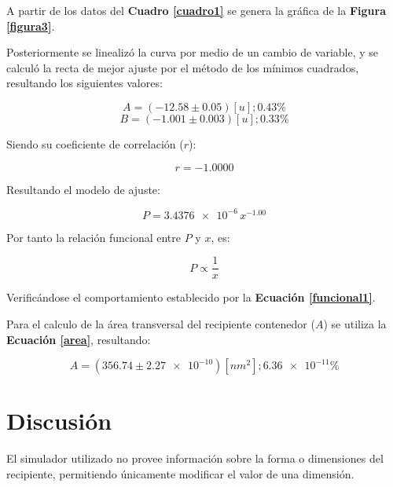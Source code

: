 \documentclass[letter,11pt]{article}
\begin{document}
A partir de los datos del \textbf{Cuadro \ref{cuadro1}} se genera la gráfica de
la \textbf{Figura \ref{figura3}}.

Posteriormente se linealizó la curva por medio de un cambio de variable, y se
calculó la recta de mejor ajuste por el método de los mínimos cuadrados,
resultando los siguientes valores:

\begin{equation*}
    A = (-12.58 \pm 0.05) [u]; 0.43\%
\end{equation*}
\begin{equation*}
    B = (-1.001 \pm 0.003) [u]; 0.33\%
\end{equation*}
\vspace{0.10cm}

Siendo su coeficiente de correlación ($r$):

\begin{equation*}
    r = -1.0000
\end{equation*}
\vspace{0.10cm}

Resultando el modelo de ajuste:

\begin{equation*}
    P = \num{3.4376e-6}\,x^{-1.00}
\end{equation*}
\vspace{0.10cm}

Por tanto la relación funcional entre $P$ y $x$, es:

\begin{equation*}
    P \propto \frac{1}{x}
\end{equation*}
\vspace{0.10cm}

Verificándose el comportamiento establecido por la
\textbf{Ecuación \ref{funcional1}}.

Para el calculo de la área transversal del recipiente contenedor ($A$) se
utiliza la \textbf{Ecuación \ref{area}}, resultando:

\begin{equation*}
    A = (356.74 \pm \num{2.27e-10}) [nm^2]; \num{6.36e-11}\%
\end{equation*}
\vspace{0.10cm}

\section{Discusión}

El simulador utilizado no provee información sobre la forma o dimensiones del
recipiente, permitiendo únicamente modificar el valor de una dimensión.
\end{document}
